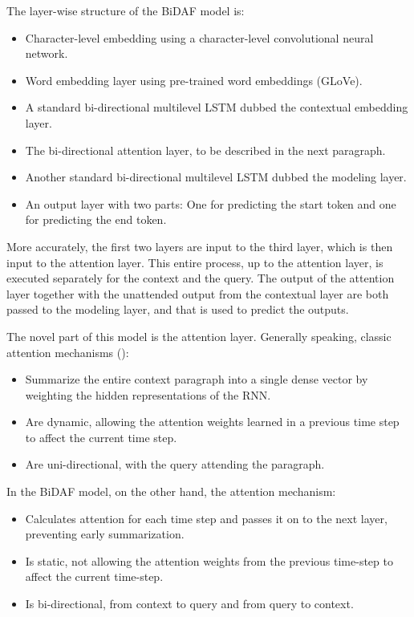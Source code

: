 \documentclass[12pt, a4paper]{article}
\begin{document}
\begin{multicols}{2}
			The layer-wise structure of the BiDAF model is:
			\begin{itemize}
				\item Character-level embedding using a character-level convolutional neural network.
				\item Word embedding layer using pre-trained word embeddings (GLoVe).
				\item A standard bi-directional multilevel LSTM dubbed the contextual embedding layer.
				\item The bi-directional attention layer, to be described in the next paragraph.
				\item Another standard bi-directional multilevel LSTM dubbed the modeling layer.
				\item An output layer with two parts: One for predicting the start token and one for predicting the end token.
			\end{itemize}
		
			More accurately, the first two layers are input to the third layer, which is then input to the attention layer. This entire process, up to the attention layer, is executed separately for the context and the query. The output of the attention layer together with the unattended output from the contextual layer are both passed to the modeling layer, and that is used to predict the outputs.
			
			The novel part of this model is the attention layer. Generally speaking, classic attention mechanisms (\cite{Bahdanau2014}):
			\begin{itemize}
				\item Summarize the entire context paragraph into a single dense vector by weighting the hidden representations of the RNN.
				\item Are dynamic, allowing the attention weights learned in a previous time step to affect the current time step.
				\item Are uni-directional, with the query attending the paragraph.
			\end{itemize}
		
			In the BiDAF model, on the other hand, the attention mechanism:
			\begin{itemize}
				\item Calculates attention for each time step and passes it on to the next layer, preventing early summarization.
				\item Is static, not allowing the attention weights from the previous time-step to affect the current time-step.
				\item Is bi-directional, from context to query and from query to context.
			\end{itemize}
		

\end{multicols}
\end{document}
